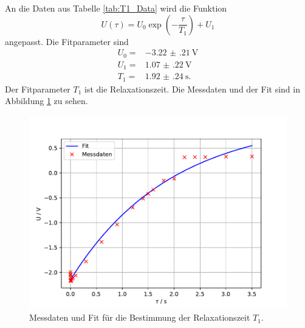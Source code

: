 An die Daten aus Tabelle \ref{tab:T1_Data} wird die Funktion 
\begin{equation}
  \label{eq:Fit_Funktion_T1T2}
  U(\tau)= U_{\text{0}} \exp{\left(-\frac{\tau}{T_{\text{1}}}\right)} + U_{\text{1}}
\end{equation}
angepasst.
Die Fitparameter sind
\begin{align*}
  U_{\text{0}} =& \SI{-3.22(21)}{\volt}\\
  U_{\text{1}} =& \SI{1.07(22)}{\volt}\\
  T_{\text{1}} =& \SI{1.92(24)}{\second}.
\end{align*}
Der Fitparameter $T_{\text{1}}$ ist die Relaxationszeit.
Die Messdaten und der Fit sind in Abbildung \ref{fig:T1_Data_fit} zu sehen.
\begin{figure}
  \centering
  \includegraphics[width = \textwidth, keepaspectratio]{figure/T1_fit.pdf}
  \caption{Messdaten und Fit für die Bestimmung der Relaxationszeit $T_{\text{1}}$.}
  \label{fig:T1_Data_fit}
\end{figure}
\FloatBarrier
